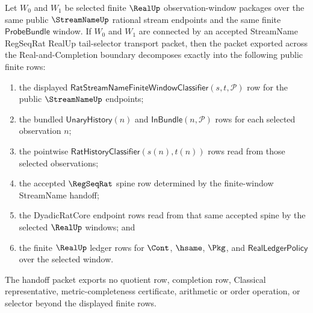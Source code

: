 \begin{theorem}
\label{thm:streamname-regseqrat-tail-selector-handoff-exactness}
Let $W_0$ and $W_1$ be selected finite $\RealUp$ observation-window packages
over the same public $\StreamNameUp$ rational stream endpoints and the same
finite $\mathsf{ProbeBundle}$ window. If $W_0$ and $W_1$ are connected by an
accepted StreamName RegSeqRat RealUp tail-selector transport packet, then the
packet exported across the Real-and-Completion boundary decomposes exactly into
the following public finite rows:
\begin{enumerate}
\item the displayed
$\mathsf{RatStreamNameFiniteWindowClassifier}(s,t,\mathcal P)$ row for the
public $\StreamNameUp$ endpoints;
\item the bundled $\mathsf{UnaryHistory}(n)$ and
$\mathsf{InBundle}(n,\mathcal P)$ rows for each selected observation $n$;
\item the pointwise $\mathsf{RatHistoryClassifier}(s(n),t(n))$ rows read from
those selected observations;
\item the accepted $\RegSeqRat$ spine row determined by the finite-window
StreamName handoff;
\item the DyadicRatCore endpoint rows read from that same accepted spine by the
selected $\RealUp$ windows; and
\item the finite $\RealUp$ ledger rows for $\Cont$, $\hsame$, $\Pkg$, and
$\mathsf{RealLedgerPolicy}$ over the selected window.
\end{enumerate}

The handoff packet exports no quotient row, completion row, Classical
representative, metric-completeness certificate, arithmetic or order operation,
or selector beyond the displayed finite rows.
\end{theorem}
